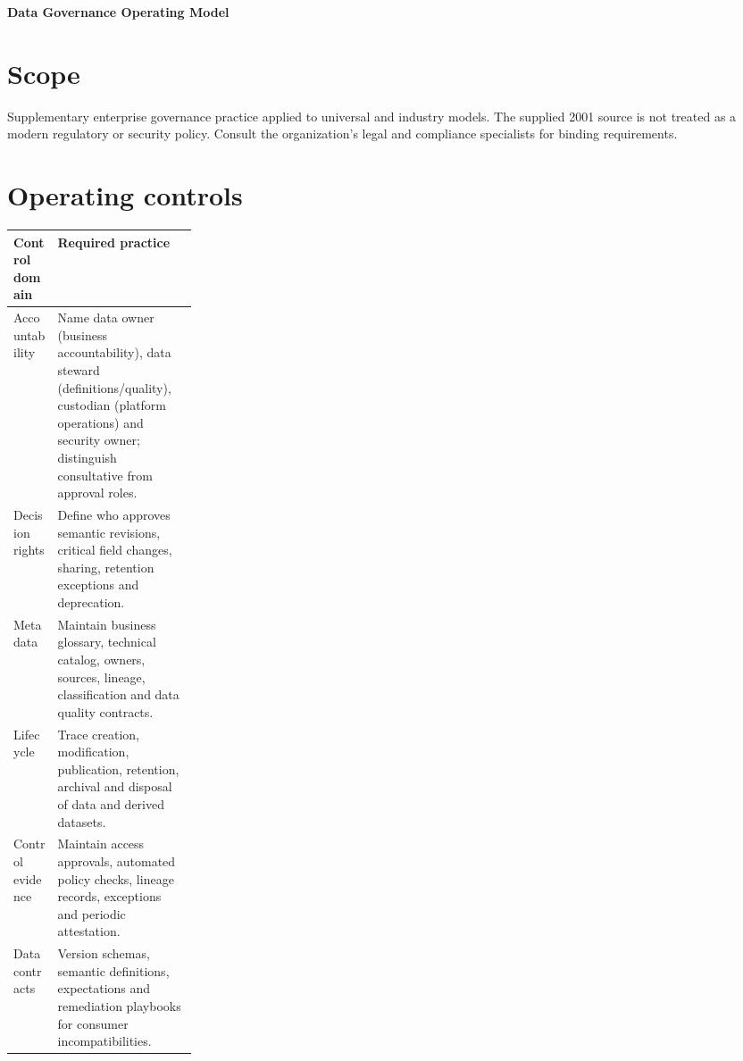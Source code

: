 \documentclass[11pt,letterpaper]{article}
\begin{document}
\begin{center}
{\LARGE\bfseries\color{navy} Data Governance Operating Model}\par
\vspace{0.25em}{\large Supplementary governance reference}\par
{}
\end{center}
\vspace{0.8em}
\section{Scope}
Supplementary enterprise governance practice applied to universal and industry models. The supplied 2001 source is not treated as a modern regulatory or security policy. Consult the organization's legal and compliance specialists for binding requirements.


\section{Operating controls}
\begin{tabularx}{\linewidth}{@{}>{\raggedright\arraybackslash}p{0.24\linewidth}>{\raggedright\arraybackslash}X@{}}
\toprule
\textbf{Control domain} & \textbf{Required practice} \\ 
\midrule
Accountability & Name data owner (business accountability), data steward (definitions/quality), custodian (platform operations) and security owner; distinguish consultative from approval roles. \\ 
Decision rights & Define who approves semantic revisions, critical field changes, sharing, retention exceptions and deprecation. \\ 
Metadata & Maintain business glossary, technical catalog, owners, sources, lineage, classification and data quality contracts. \\ 
Lifecycle & Trace creation, modification, publication, retention, archival and disposal of data and derived datasets. \\ 
Control evidence & Maintain access approvals, automated policy checks, lineage records, exceptions and periodic attestation. \\ 
Data contracts & Version schemas, semantic definitions, expectations and remediation playbooks for consumer incompatibilities. \\ 
\bottomrule
\end{tabularx}
\end{document}
